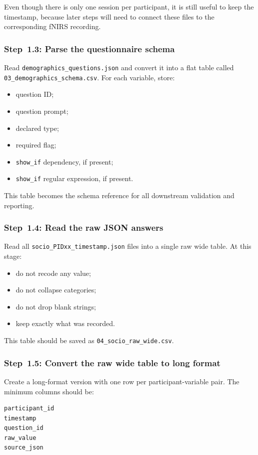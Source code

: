 Even though there is only one session per participant, it is still useful to keep the timestamp,
because later steps will need to connect these files to the corresponding fNIRS recording.

\subsubsection{Step~1.3: Parse the questionnaire schema}
Read \texttt{demographics\_questions.json} and convert it into a flat table called
\texttt{03\_demographics\_schema.csv}.
For each variable, store:
\begin{itemize}
    \item question ID;
    \item question prompt;
    \item declared type;
    \item required flag;
    \item \texttt{show\_if} dependency, if present;
    \item \texttt{show\_if} regular expression, if present.
\end{itemize}

This table becomes the schema reference for all downstream validation and reporting. \cite{step1_demo_schema}

\subsubsection{Step~1.4: Read the raw JSON answers}
Read all \texttt{socio\_PIDxx\_timestamp.json} files into a single raw wide table.
At this stage:
\begin{itemize}
    \item do not recode any value;
    \item do not collapse categories;
    \item do not drop blank strings;
    \item keep exactly what was recorded.
\end{itemize}

This table should be saved as \texttt{04\_socio\_raw\_wide.csv}.

\subsubsection{Step~1.5: Convert the raw wide table to long format}
Create a long-format version with one row per participant-variable pair.
The minimum columns should be:
\begin{verbatim}
participant_id
timestamp
question_id
raw_value
source_json
\end{verbatim}

